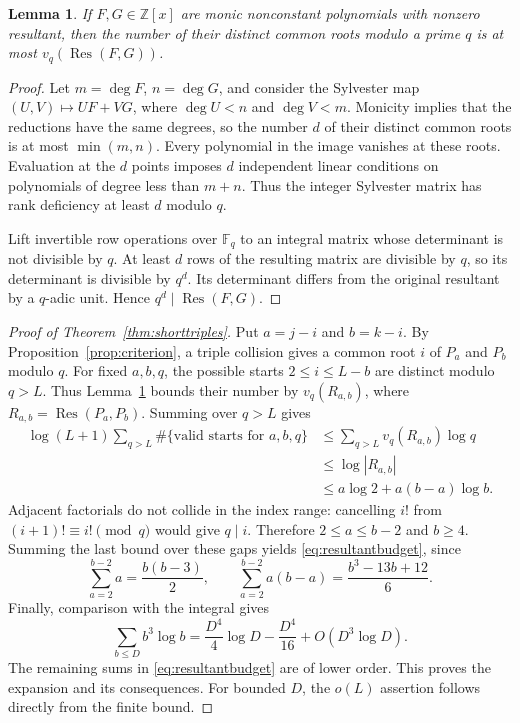 \documentclass[11pt]{amsart}
\newtheorem{lemma}[theorem]{Lemma}
\theoremstyle{definition}
\theoremstyle{remark}
\begin{document}
\begin{lemma}\label{lem:rootvaluation}
If $F,G\in\mathbb Z[x]$ are monic nonconstant polynomials with nonzero
resultant, then the number of their
distinct common roots modulo a prime $q$ is at most
$v_q(\operatorname{Res}(F,G))$.
\end{lemma}
\begin{proof}
Let $m=\deg F$, $n=\deg G$, and consider the Sylvester map
$(U,V)\mapsto UF+VG$, where $\deg U<n$ and $\deg V<m$.
Monicity implies that the reductions have the same degrees, so the
number $d$ of their distinct common roots is at most $\min(m,n)$.
Every polynomial in the image vanishes at these roots. Evaluation at the $d$ points imposes
$d$ independent linear conditions on polynomials of degree less than
$m+n$. Thus the integer Sylvester matrix has rank deficiency at least
$d$ modulo $q$.

Lift invertible row operations over $\mathbb F_q$ to an integral matrix
whose determinant is not divisible by $q$. At least $d$ rows of the
resulting matrix are divisible by $q$, so its determinant is divisible
by $q^d$. Its determinant differs from the original resultant by a
$q$-adic unit. Hence $q^d\mid\operatorname{Res}(F,G)$.
\end{proof}

\begin{proof}[Proof of Theorem~\ref{thm:shorttriples}]
Put $a=j-i$ and $b=k-i$. By Proposition~\ref{prop:criterion}, a triple
collision gives a common root $i$ of $P_a$ and $P_b$ modulo $q$.
For fixed $a,b,q$, the possible starts $2\leq i\leq L-b$ are distinct
modulo $q>L$. Thus Lemma~\ref{lem:rootvaluation} bounds their number
by $v_q(R_{a,b})$, where $R_{a,b}=\operatorname{Res}(P_a,P_b)$.
Summing over $q>L$ gives
\[
\begin{aligned}
\log(L+1)\sum_{q>L}\#\{\text{valid starts for }a,b,q\}
&\leq\sum_{q>L}v_q(R_{a,b})\log q\\
&\leq\log|R_{a,b}|\\
&\leq a\log2+a(b-a)\log b.
\end{aligned}
\]
Adjacent factorials do not collide in the index range: cancelling $i!$
from $(i+1)!\equiv i!\pmod q$ would give $q\mid i$.
Therefore $2\leq a\leq b-2$ and $b\geq4$. Summing the last bound over
these gaps yields \eqref{eq:resultantbudget}, since
\[
\sum_{a=2}^{b-2}a=\frac{b(b-3)}2,
\qquad
\sum_{a=2}^{b-2}a(b-a)=\frac{b^3-13b+12}{6}.
\]
Finally, comparison with the integral gives
\[
\sum_{b\leq D}b^3\log b
=\frac{D^4}{4}\log D-\frac{D^4}{16}+O(D^3\log D).
\]
The remaining sums in \eqref{eq:resultantbudget} are of lower order.
This proves the expansion and its consequences. For bounded $D$, the
$o(L)$ assertion follows directly from the finite bound.
\end{proof}
\end{document}

